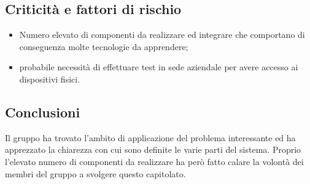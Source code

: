 \subsection{Criticità e fattori di rischio}
\begin{itemize}
	\item Numero elevato di componenti da realizzare ed integrare che comportano di conseguenza molte tecnologie da apprendere; 
	\item probabile necessità di effettuare test in sede aziendale per avere accesso ai dispositivi fisici.
\end{itemize}
\subsection{Conclusioni}
Il gruppo ha trovato l'ambito di applicazione del problema interessante ed ha apprezzato la chiarezza con cui sono definite le varie parti del sistema. Proprio l'elevato numero di componenti da realizzare ha però fatto calare la volontà dei membri del gruppo a svolgere questo capitolato\glo.
